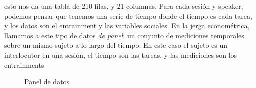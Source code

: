 esto nos da una tabla de 210 filas, y 21 columnas. Para cada sesión y speaker, podemos pensar que tenemos una serie de tiempo donde el tiempo es cada tarea, y los datos son el entrainment y las variables sociales. En la jerga econométrica, llamamos a este tipo de datos \emph{de panel}\cite{gujarati1999}: un conjunto de mediciones temporales sobre un mismo sujeto a lo largo del tiempo. En este caso el sujeto es un interlocutor en una sesión, el tiempo son las tareas, y las mediciones son los entrainments


\begin{figure}
\centering

\caption{Panel de datos}
\label{panel_data}
\end{figure}
